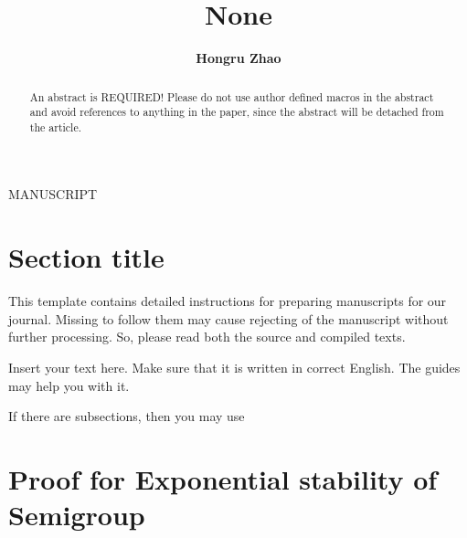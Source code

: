 \documentclass[a4paper,draft]{amsproc}
\title[Running title / header]{None}
\author[Hongru Zhao]{\bfseries Hongru Zhao} %
\theoremstyle{plain}
\theoremstyle{definition}
\theoremstyle{remark}
\numberwithin{equation}{section}
\begin{document}
{\begin{flushleft}\baselineskip9pt\scriptsize
MANUSCRIPT
\end{flushleft}}
\vspace{18mm} \setcounter{page}{1} \thispagestyle{empty}


\begin{abstract}
An abstract is REQUIRED!
Please do not use author defined macros in the abstract
and avoid references to anything in the paper,
since the abstract will be detached from the article.
\end{abstract}

\maketitle

\section{Section title}  %

This template contains detailed instructions for preparing manuscripts for our journal.
Missing to follow them may cause rejecting of the manuscript without further processing.
So, please read both the source and compiled texts.

Insert your text here. Make sure that it is written in correct English. 
The guides \cite{TrzD,TrzE} may help you with it.

If there are subsections, then you may use


\section{Proof for Exponential stability of Semigroup}  %
\end{document}
